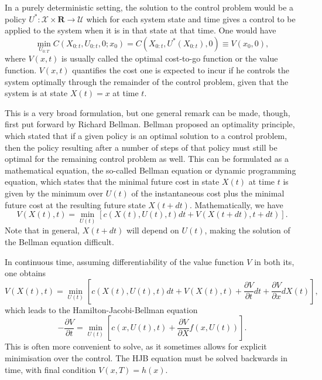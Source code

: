 In a purely deterministic setting, the solution to the control problem would be a policy $U^* : \mathcal{X} \times \mathbf{R}\to \mathcal{U}$ which for each system 
state and time gives a control to be applied to the system when it is in that state at that time. One would have
$$
\min_{U_{0:T}} C(X_{0:t},U_{0:t},0;x_0) = C\left(X_{0:t},U^*(X_{0:t}),0\right) \equiv V(x_0,0),
$$
where $V(x,t)$ is usually called the optimal cost-to-go function or the value function. $V(x,t)$ quantifies the cost one is expected to incur if he controls the system optimally through the 
remainder of the control problem, given that the system is at state $X(t)=x$ at time $t$.\par

This is a very broad formulation, but one general remark can be made, though, first put forward by Richard Bellman. Bellman 
proposed an optimality principle, which stated that if a given policy is an optimal solution to a control problem, then the 
policy resulting after a number of steps of that policy must still be optimal for the remaining control problem as well. This can be formulated as a mathematical equation, 
the so-called Bellman equation or dynamic programming equation, which states that the minimal future cost in state $X(t)$ at time $t$ is given by the minimum over 
$U(t)$ of the instantaneous cost plus the minimal future cost at the resulting future state $X({t+dt})$. Mathematically, we have
\begin{equation}
\label{eq:bellman_eq}
V(X(t),t) = \min_{U(t)} \left[ c(X(t),U(t),t) dt +V(X({t+dt}),t+dt)\right].
\end{equation}
Note that in general, $X({t+dt})$ will depend on $U(t)$, making the solution of the Bellman equation difficult.\par
In continuous time, assuming differentiability of the value function $V$ in both its, one obtains
\[
V(X(t),t) = \min_{U(t)} \left[c(X(t),U(t),t) dt + V(X(t),t) + \frac{\partial V}{\partial t} dt + \frac{\partial V}{\partial x} dX(t) \right],
\]
which leads to the Hamilton-Jacobi-Bellman equation
$$
-\frac{\partial V}{\partial t} = \min_{U(t)} \left[c(x,U(t),t) + \frac{\partial V}{\partial X} f(x,U(t)) \right].
$$
This is often more convenient to solve, as it sometimes allows for explicit minimisation over the control. The HJB equation must be solved backwards in time, with final condition $V(x,T) = h(x)$.

